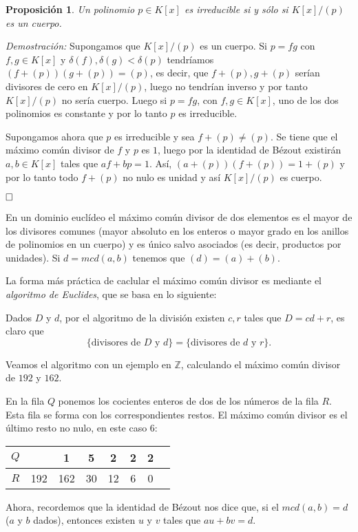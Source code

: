 \documentclass[12pt]{article}
\newtheorem{proposition}[theorem]{Proposición}
\begin{document}
\begin{proposition}Un polinomio $p \in K[x]$ es irreducible si y sólo si $K[x]/(p)$ es un cuerpo.
\end{proposition}
\emph{Demostración: }Supongamos que $K[x]/(p)$ es un cuerpo. Si $p = fg$ con $f,g \in K[x]$ y $\delta(f), \delta(g) <\delta(p)$ tendríamos $(f+(p))(g+(p)) = (p)$, es decir, que $f+(p), g+(p)$ serían divisores de cero en $K[x]/(p)$, luego no tendrían inverso y por tanto $K[x]/(p)$ no sería cuerpo. Luego si $p=fg$, con $f,g \in K[x]$, uno de los dos polinomios es constante y por lo tanto $p$ es irreducible.

Supongamos ahora que $p$ es irreducible y sea $f+(p) \neq (p)$. Se tiene que el máximo común divisor de $f$ y $p$ es $1$, luego por la identidad de Bézout existirán $a,b \in K[x]$ tales que $af + bp = 1$. Así, $(a+(p))(f+(p)) = 1+(p)$ y por lo tanto todo $f+(p)$ no nulo es unidad y así $K[x]/(p)$ es cuerpo.

$\hfill \square$

En un dominio euclídeo el máximo común divisor de dos elementos es el mayor de los divisores comunes (mayor absoluto en los enteros o mayor grado en los anillos de polinomios en un cuerpo) y es único salvo asociados (es decir, productos por unidades). Si $d = mcd(a,b)$ tenemos que $(d) = (a) +(b)$.

La forma más práctica de caclular el máximo común divisor es mediante el \textit{algoritmo de Euclides}, que se basa en lo siguiente: 

Dados $D$ y $d$, por el algoritmo de la división existen $c,r$ tales que $D = cd+r$, es claro que $$\lbrace \text{divisores de $D$ y $d$} \rbrace = \lbrace \text{divisores de $d$ y $r$} \rbrace.$$

Veamos el algoritmo con un ejemplo en $\mathbb{Z}$, calculando el máximo común divisor de $192$ y $162$.

En la fila $Q$ ponemos los cocientes enteros de dos de los números de la fila $R$. Esta fila se forma con los correspondientes restos. El máximo común divisor es el último resto no nulo, en este caso $6$:
\begin{center}
\begin{tabular}{| c | c c c c c c c}
\hline
$Q$ &&1&5&2&2&2&\\ \hline
$R$ &192&162&30&12&6&0 \\																	\end{tabular}
\end{center}

Ahora, recordemos que la identidad de Bézout nos dice que, si el $mcd(a,b) = d$ ($a$ y $b$ dados), entonces existen $u$ y $v$ tales que $au+bv = d$.
\end{document}

